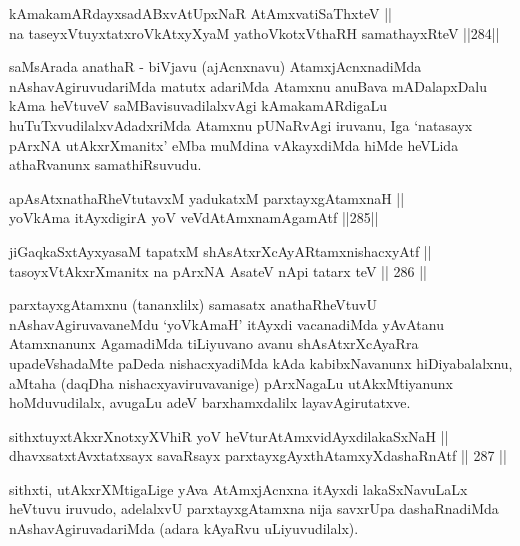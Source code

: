 \begin{shl}
kAmakamARdayxsadABxvAtUpxNaR AtAmx\s vatiSaThxteV ||  \\
na taseyxVtuyxtatxroVkAtxyX\s yaM yathoVkotxV\s thaRH samathayxRteV \hfill ||284||  
\end{shl}

\begin{artha}
saMsArada anathaR - biVjavu (ajAcnxnavu) AtamxjAcnxnadiMda
nAshavAgiruvudariMda matutx adariMda Atamxnu anuBava mADalapxDalu kAma
heVtuveV saMBavisuvadilalxvAgi kAmakamARdigaLu huTuTxvudilalxvAdadxriMda
Atamxnu pUNaRvAgi iruvanu, Iga `natasayx pArxNA utAkxrXmanitx' eMba
muMdina vAkayxdiMda hiMde heVLida athaRvanunx samathiRsuvudu.
\end{artha}

\begin{shl}
apAsAtxnathaRheVtutavxM yadukatxM parxtayxgAtamxnaH || \\
yoV\s kAma itAyxdigirA yoV veVdA\s \s tAmxnamAgamAtf \hfill ||285||  
\end{shl}

\begin{shl}
jiGaqkaSxtAyxyasaM tapatxM shAsAtxrXcAyARtamxnishacxyAtf ||  \\
tasoyxVtAkxrXmanitx na pArxNA AsateV nApi tatarx teV \hfill || 286 ||  
\end{shl}

\begin{artha}
parxtayxgAtamxnu (tananxlilx) samasatx anathaRheVtuvU
nAshavAgiruvavaneMdu `yoV\s kAmaH' itAyxdi vacanadiMda yAvAtanu
Atamxnanunx AgamadiMda tiLiyuvano avanu shAsAtxrXcAyaRra
upadeVshadaMte paDeda nishacxyadiMda kAda kabibxNavanunx
hiDiyabalalxnu, aMtaha (daqDha nishacxyaviruvavanige) pArxNagaLu
utAkxMtiyanunx hoMduvudilalx, avugaLu adeV barxhamxdalilx
layavAgirutatxve.
\end{artha}


\begin{shl}
sithxtuyxtAkxrXnotxyXVhiR yoV heVturAtAmxvidAyxdilakaSxNaH || \\
dhavxsatxtAvxtatxsayx savaRsayx parxtayxgAyxthAtamxyXdashaRnAtf \hfill || 287 ||  
\end{shl}

\begin{artha}
sithxti, utAkxrXMtigaLige yAva AtAmxjAcnxna itAyxdi lakaSxNavuLaLx
heVtuvu iruvudo, adelalxvU parxtayxgAtamxna nija savxrUpa
dashaRnadiMda nAshavAgiruvadariMda (adara kAyaRvu uLiyuvudilalx).
\end{artha}

